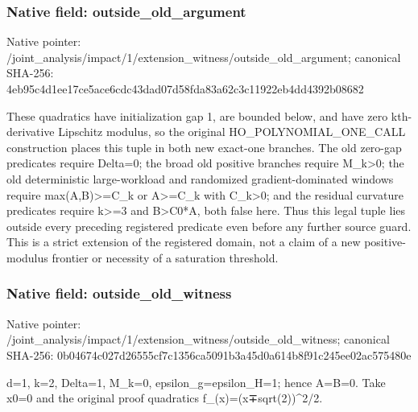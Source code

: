 \documentclass[10pt,a4paper]{article}
\begin{document}
\subsubsection{Native field: outside\_\allowbreak{}old\_\allowbreak{}argument}
Native pointer: /joint\_\allowbreak{}analysis/impact/1/extension\_\allowbreak{}witness/outside\_\allowbreak{}old\_\allowbreak{}argument; canonical SHA-256: 4eb95c4d1ee17ce5ace6cdc43dad07d58fda83a62c3c11922eb4dd4392b08682

\begingroup\raggedright\sloppy These quadratics have initialization gap 1,\allowbreak{} are bounded below,\allowbreak{} and have zero kth-derivative Lipschitz modulus,\allowbreak{} so the original HO\_\allowbreak{}POLYNOMIAL\_\allowbreak{}ONE\_\allowbreak{}CALL construction places this tuple in both new exact-one branches. The old zero-gap predicates require Delta=\allowbreak{}0;\allowbreak{} the broad old positive branches require M\_\allowbreak{}k>0;\allowbreak{} the old deterministic large-workload and randomized gradient-dominated windows require max(A,\allowbreak{}B)>=\allowbreak{}C\_\allowbreak{}k or A>=\allowbreak{}C\_\allowbreak{}k with C\_\allowbreak{}k>0;\allowbreak{} and the residual curvature predicates require k>=\allowbreak{}3 and B>C0*A,\allowbreak{} both false here. Thus this legal tuple lies outside every preceding registered predicate even before any further source guard. This is a strict extension of the registered domain,\allowbreak{} not a claim of a new positive-modulus frontier or necessity of a saturation threshold.\par\endgroup

\subsubsection{Native field: outside\_\allowbreak{}old\_\allowbreak{}witness}
Native pointer: /joint\_\allowbreak{}analysis/impact/1/extension\_\allowbreak{}witness/outside\_\allowbreak{}old\_\allowbreak{}witness; canonical SHA-256: 0b04674c027d26555cf7c1356ca5091b3a45d0a614b8f91c245ee02ac575480e

\begingroup\raggedright\sloppy d=\allowbreak{}1,\allowbreak{} k=\allowbreak{}2,\allowbreak{} Delta=\allowbreak{}1,\allowbreak{} M\_\allowbreak{}k=\allowbreak{}0,\allowbreak{} epsilon\_\allowbreak{}g=\allowbreak{}epsilon\_\allowbreak{}H=\allowbreak{}1;\allowbreak{} hence A=\allowbreak{}B=\allowbreak{}0. Take x0=\allowbreak{}0 and the original proof quadratics f\_\allowbreak{}(x)=\allowbreak{}(x{\AtlasUnicodeSymbols ∓}\allowbreak{}sqrt(2))\textasciicircum{}2/\allowbreak{}2.\par\endgroup
\end{document}
